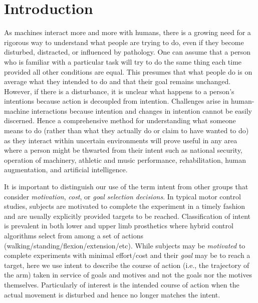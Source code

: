 \documentclass[10pt]{article}
\begin{document}
\section*{Introduction}
As machines interact more and more with humans, there is a growing need for a rigorous way to understand what people are trying to do, even if they become disturbed, distracted, or influenced by pathology. One can assume that a person who is familiar with a particular task will try to do the same thing each time provided all other conditions are equal. This presumes that what people do is on average what they intended to do and that their goal remains unchanged. However, if there is a disturbance, it is unclear what happens to a person's intentions because action is decoupled from intention. Challenges arise in human-machine interactions because intention and changes in intention cannot be easily discerned. Hence a comprehensive method for understanding what someone means to do (rather than what they actually do or claim to have wanted to do) as they interact within uncertain environments will prove useful in any area where a person might be thwarted from their intent such as national security, operation of machinery, athletic and music performance, rehabilitation, human augmentation, and artificial intelligence.

It is important to distinguish our use of the term intent from other groups that consider \textit{motivation}\cite{mcclelland1985motives, rawolle2013relationships}, \textit{cost}\cite{todorov2002optimal, flash1985coordination}, or \textit{goal selection decisions}\cite{ziebart2010modeling}. In typical motor control studies, subjects are motivated to complete the experiment in a timely fashion and are usually explicitly provided targets to be reached. Classification of intent is prevalent in both lower \cite{strausser2011development, hargrove2013robotic} and upper limb\cite{englehart2003robust, young2012improving} prosthetics where hybrid control algorithms select from among a set of actions (walking/standing/flexion/extension/etc). While subjects may be \textit{motivated} to complete experiments with minimal effort/cost and their \textit{goal} may be to reach a target, here we use intent to describe the course of action (i.e., the trajectory of the arm) taken in service of goals and motives and not the goals nor the motives themselves. Particularly of interest is the intended course of action when the actual movement is disturbed and hence no longer matches the intent.
\end{document}
